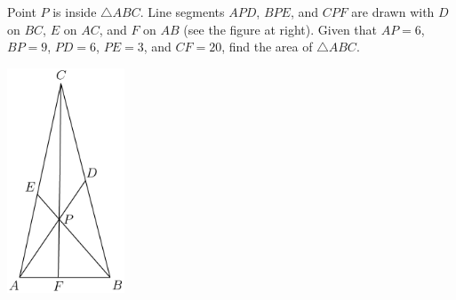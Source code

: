 Point $P$ is inside $\triangle ABC$. Line segments $APD$, $BPE$, and $CPF$ are drawn with $D$ on $BC$, $E$ on $AC$, and $F$ on $AB$ (see the figure at right). Given that $AP=6$, $BP=9$, $PD=6$, $PE=3$, and $CF=20$, find the area of $\triangle ABC$.

\begin{center}
\includegraphics[width = 35.0mm]{img/fig0.png}
\end{center}